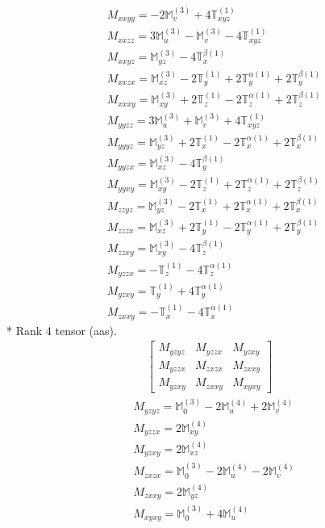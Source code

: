 \documentclass[fleqn,8pt,landscape]{jsarticle}
\begin{document}
\begin{align*}
& M_{xxyy} = - 2 \mathbb{M}_{v}^{(3)} + 4 \mathbb{T}_{xyz}^{(1)} \\
& M_{xxzz} = 3 \mathbb{M}_{u}^{(3)} - \mathbb{M}_{v}^{(3)} - 4 \mathbb{T}_{xyz}^{(1)} \\
& M_{xxyz} = \mathbb{M}_{yz}^{(3)} - 4 \mathbb{T}_{x}^{\beta(1)} \\
& M_{xxzx} = \mathbb{M}_{xz}^{(3)} - 2 \mathbb{T}_{y}^{(1)} + 2 \mathbb{T}_{y}^{\alpha(1)} + 2 \mathbb{T}_{y}^{\beta(1)} \\
& M_{xxxy} = \mathbb{M}_{xy}^{(3)} + 2 \mathbb{T}_{z}^{(1)} - 2 \mathbb{T}_{z}^{\alpha(1)} + 2 \mathbb{T}_{z}^{\beta(1)} \\
& M_{yyzz} = 3 \mathbb{M}_{u}^{(3)} + \mathbb{M}_{v}^{(3)} + 4 \mathbb{T}_{xyz}^{(1)} \\
& M_{yyyz} = \mathbb{M}_{yz}^{(3)} + 2 \mathbb{T}_{x}^{(1)} - 2 \mathbb{T}_{x}^{\alpha(1)} + 2 \mathbb{T}_{x}^{\beta(1)} \\
& M_{yyzx} = \mathbb{M}_{xz}^{(3)} - 4 \mathbb{T}_{y}^{\beta(1)} \\
& M_{yyxy} = \mathbb{M}_{xy}^{(3)} - 2 \mathbb{T}_{z}^{(1)} + 2 \mathbb{T}_{z}^{\alpha(1)} + 2 \mathbb{T}_{z}^{\beta(1)} \\
& M_{zzyz} = \mathbb{M}_{yz}^{(3)} - 2 \mathbb{T}_{x}^{(1)} + 2 \mathbb{T}_{x}^{\alpha(1)} + 2 \mathbb{T}_{x}^{\beta(1)} \\
& M_{zzzx} = \mathbb{M}_{xz}^{(3)} + 2 \mathbb{T}_{y}^{(1)} - 2 \mathbb{T}_{y}^{\alpha(1)} + 2 \mathbb{T}_{y}^{\beta(1)} \\
& M_{zzxy} = \mathbb{M}_{xy}^{(3)} - 4 \mathbb{T}_{z}^{\beta(1)} \\
& M_{yzzx} = - \mathbb{T}_{z}^{(1)} - 4 \mathbb{T}_{z}^{\alpha(1)} \\
& M_{yzxy} = \mathbb{T}_{y}^{(1)} + 4 \mathbb{T}_{y}^{\alpha(1)} \\
& M_{zxxy} = - \mathbb{T}_{x}^{(1)} - 4 \mathbb{T}_{x}^{\alpha(1)}
\end{align*}
* Rank 4 tensor (aas).
\begin{align*}
\begin{bmatrix} M_{yzyz} & M_{yzzx} & M_{yzxy} \\ M_{yzzx} & M_{zxzx} & M_{zxxy} \\ M_{yzxy} & M_{zxxy} & M_{xyxy} \end{bmatrix}
\end{align*}
\begin{align*}
& M_{yzyz} = \mathbb{M}_{0}^{(3)} - 2 \mathbb{M}_{u}^{(4)} + 2 \mathbb{M}_{v}^{(4)} \\
& M_{yzzx} = 2 \mathbb{M}_{xy}^{(4)} \\
& M_{yzxy} = 2 \mathbb{M}_{xz}^{(4)} \\
& M_{zxzx} = \mathbb{M}_{0}^{(3)} - 2 \mathbb{M}_{u}^{(4)} - 2 \mathbb{M}_{v}^{(4)} \\
& M_{zxxy} = 2 \mathbb{M}_{yz}^{(4)} \\
& M_{xyxy} = \mathbb{M}_{0}^{(3)} + 4 \mathbb{M}_{u}^{(4)}
\end{align*}
\end{document}
